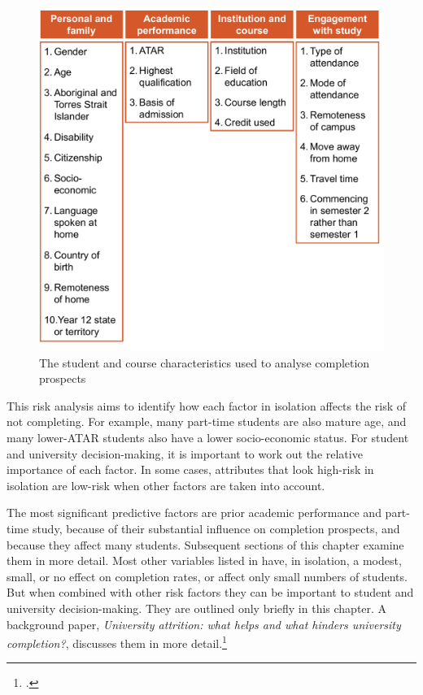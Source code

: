                 \begin{figure}
                    \caption{The student and course characteristics used to analyse completion prospects \label{fig:table1}}%
                    \includegraphics[page=1]{atlas/selection_deck_halfpage.pdf} 
                \end{figure}


This risk analysis aims to identify how each factor in isolation affects the risk of not completing. For example, many part-time students are also mature age, and many lower-ATAR students also have a lower socio-economic status. For student and university decision-making, it is important to work out the relative importance of each factor. In some cases, attributes that look high-risk in isolation are low-risk when other factors are taken into account.

The most significant predictive factors are prior academic performance and part-time study, because of their substantial influence on completion prospects, and because they affect many students. Subsequent sections of this chapter examine them in more detail. Most other variables listed in  have, in isolation, a modest, small, or no effect on completion rates, or affect only small numbers of students. But when combined with other risk factors they can be important to student and university decision-making. They are outlined only briefly in this chapter. A background paper, \emph{University attrition: what helps and what hinders university completion?}, discusses them in more detail.\footcite[][]{Cherastidtham2018a}


